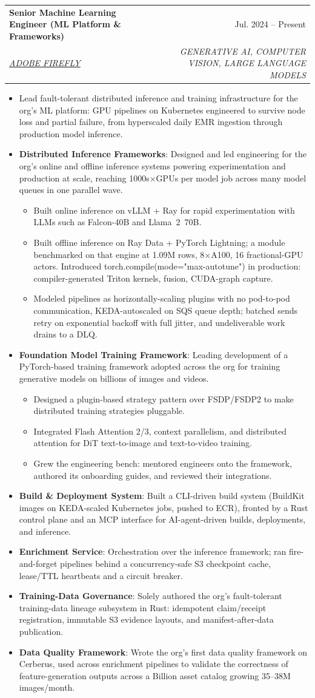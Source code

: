 \documentclass[letterpaper]{article}
\makeatletter
\newcommand{\resumeItem}[1]{%
  \item\small{\justifying #1}%
}
\newcommand{\resumeSubheading}[4]{%
  \item%
    \begin{tabular*}{0.97\textwidth}{@{}l@{\extracolsep{\fill}}r@{}}%
      \textbf{\textcolor{accentdark}{#1}} & #2 \\%
      \textit{\small#3} & \textit{\small #4} \\%
    \end{tabular*}%
}
\newcommand{\resumeTopic}[2]{%
  \item\small{\justifying \textbf{#1}: #2}%
}
\newcommand{\resumeItemListStart}{\begin{itemize}}
\newcommand{\resumeItemListEnd}{\end{itemize}}
\makeatother
\begin{document}
  \resumeSubheading
    {Senior Machine Learning Engineer (ML Platform \& Frameworks)}{Jul. 2024 -- Present}
    {{\href{https://www.linkedin.com/company/adobe/}{\textcolor{accentdark}{\underline{ADOBE FIREFLY}}}}}{GENERATIVE AI, COMPUTER VISION, LARGE LANGUAGE MODELS}
    \resumeItemListStart
      \resumeItem{Lead fault-tolerant distributed inference and training infrastructure for the org's ML platform: GPU pipelines on Kubernetes engineered to survive node loss and partial failure, from hyperscaled daily EMR ingestion through production model inference.}
      \resumeTopic{Distributed Inference Frameworks}{Designed and led engineering for the org's online and offline inference systems powering experimentation and production at scale, reaching 1000s$\times$GPUs per model job across many model queues in one parallel wave.}
        \resumeItemListStart
          \resumeItem{Built online inference on vLLM + Ray for rapid experimentation with LLMs such as Falcon-40B and Llama~2~70B.}
          \resumeItem{Built offline inference on Ray Data + PyTorch Lightning; a module benchmarked on that engine at 1.09M rows, 8$\times$A100, 16 fractional-GPU actors. Introduced torch.compile(mode="max-autotune") in production: compiler-generated Triton kernels, fusion, CUDA-graph capture.}
          \resumeItem{Modeled pipelines as horizontally-scaling plugins with no pod-to-pod communication, KEDA-autoscaled on SQS queue depth; batched sends retry on exponential backoff with full jitter, and undeliverable work drains to a DLQ.}
        \resumeItemListEnd
      \resumeTopic{Foundation Model Training Framework}{Leading development of a PyTorch-based training framework adopted across the org for training generative models on billions of images and videos.}
        \resumeItemListStart
          \resumeItem{Designed a plugin-based strategy pattern over FSDP/FSDP2 to make distributed training strategies pluggable.}
          \resumeItem{Integrated Flash Attention 2/3, context parallelism, and distributed attention for DiT text-to-image and text-to-video training.}
          \resumeItem{Grew the engineering bench: mentored engineers onto the framework, authored its onboarding guides, and reviewed their integrations.}
        \resumeItemListEnd
      \resumeTopic{Build \& Deployment System}{Built a CLI-driven build system (BuildKit images on KEDA-scaled Kubernetes jobs, pushed to ECR), fronted by a Rust control plane and an MCP interface for AI-agent-driven builds, deployments, and inference.}
      \resumeTopic{Enrichment Service}{Orchestration over the inference framework; ran fire-and-forget pipelines behind a concurrency-safe S3 checkpoint cache, lease/TTL heartbeats and a circuit breaker.}
      \resumeTopic{Training-Data Governance}{Solely authored the org's fault-tolerant training-data lineage subsystem in Rust: idempotent claim/receipt registration, immutable S3 evidence layouts, and manifest-after-data publication.}
      \resumeTopic{Data Quality Framework}{Wrote the org's first data quality framework on Cerberus, used across enrichment pipelines to validate the correctness of feature-generation outputs across a Billion asset catalog growing 35--38M images/month.}
    \resumeItemListEnd
\end{document}
